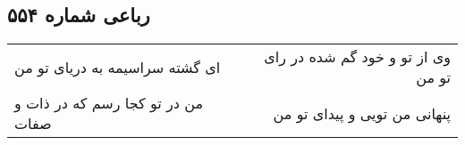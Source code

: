 \begin{center}
\section*{رباعی شماره ۵۵۴}
\label{sec:sh554}
\begin{longtable}{l p{0.5cm} r}
ای گشته سراسیمه به دریای تو من
&&
وی از تو و خود گم شده در رای تو من
\\
من در تو کجا رسم که در ذات و صفات
&&
پنهانی من تویی و پیدای تو من
\\
\end{longtable}
\end{center}
